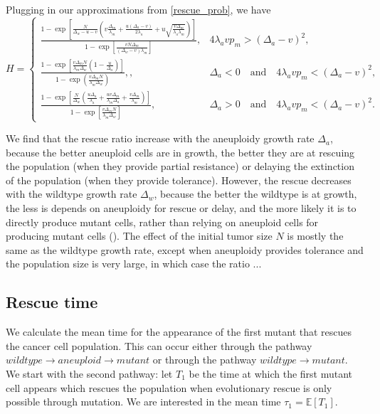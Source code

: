 \documentclass[12pt]{extarticle}
\begin{document}
Plugging in our approximations from \cref{rescue_prob}, we have
\begin{equation}\label{ratiorescue}
H = \begin{cases}
\frac{1-\exp\left[\frac{N}{\Delta_w-u-v}\left(v\frac{\Delta_m}{\lambda_m}+\frac{u\left(\Delta_a-v\right)}{2\lambda_a}+u\sqrt{\frac{v\Delta_m}{\lambda_a\lambda_m}}\right)\right]}{1-\exp\left[\frac{vN\Delta_m}{\left(\Delta_w-v\right)\lambda_m}\right]} ,&
4\lambda_avp_m>\left(\Delta_a-v\right)^2 ,\\
\frac{1-\exp\left[\frac{v\Delta_mN}{\lambda_m\Delta_w}\left(1-\frac{u}{\Delta_a}\right)\right]}{1-\exp\left(\frac{v\Delta_mN}{\lambda_m\Delta_w}\right)}, ,&
\Delta_a<0\quad\text{and}\quad4\lambda_avp_m<\left(\Delta_a-v\right)^2 ,\\
\frac{1-\exp\left[\frac{N}{\Delta_w}\left(\frac{u\Delta_a}{\lambda_a}+\frac{uv\Delta_m}{\lambda_m\Delta_a}+\frac{v\Delta_m}{\lambda_m}\right)\right]}{1-\exp\left[\frac{v\Delta_mN}{\lambda_m\Delta_w}\right]} ,&
\Delta_a>0\quad\text{and}\quad4\lambda_avp_m<\left(\Delta_a-v\right)^2. %
  \end{cases}
\end{equation}

We find that the rescue ratio increase with the aneuploidy growth rate $\Delta_a$, because the better aneuploid cells are in growth, the better they are at rescuing the population (when they provide partial resistance) or delaying the extinction of the population (when they provide tolerance). 
However, the rescue decreases with the wildtype growth rate $\Delta_w$, because the better the wildtype is at growth, the less is depends on aneuploidy for rescue or delay, and the more likely it is to directly produce mutant cells, rather than relying on aneuploid cells for producing mutant cells ().
The effect of the initial tumor size $N$ is mostly the same as the wildtype growth rate, except when aneuploidy provides tolerance and the population size is very large, in which case the ratio ... %

\subsection*{Rescue time}
We calculate the mean time for the appearance of the first mutant that rescues the cancer cell population. This can occur either through the pathway $wildtype\rightarrow aneuploid \rightarrow mutant$ or through the pathway $wildtype \rightarrow mutant$. We start with the second pathway: let $T_1$ be the time at which the first mutant cell appears which rescues the population when evolutionary rescue is only possible through mutation. We are interested in the mean time $\tau_1=\mathbb{E}\left[T_1\right]$.
\end{document}
